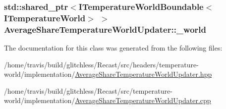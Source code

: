 \hypertarget{class_average_share_temperature_world_updater_a7327a9c0043f7fd278edcc1e7b7ecf78}{
\subsubsection[{\-\_\-world}]{\setlength{\rightskip}{0pt plus 5cm}std\-::shared\-\_\-ptr$<${\bf I\-Temperature\-World\-Boundable}$<${\bf I\-Temperature\-World}$>$ $>$ Average\-Share\-Temperature\-World\-Updater\-::\-\_\-world\hspace{0.3cm}{\ttfamily [protected]}}}\label{class_average_share_temperature_world_updater_a7327a9c0043f7fd278edcc1e7b7ecf78}


The documentation for this class was generated from the following files\-:\begin{DoxyCompactItemize}
\item 
/home/travis/build/glitchless/\-Recast/src/headers/temperature-\/world/implementation/\hyperlink{_average_share_temperature_world_updater_8hpp}{Average\-Share\-Temperature\-World\-Updater.\-hpp}\item 
/home/travis/build/glitchless/\-Recast/src/temperature-\/world/implementation/\hyperlink{_average_share_temperature_world_updater_8cpp}{Average\-Share\-Temperature\-World\-Updater.\-cpp}\end{DoxyCompactItemize}
